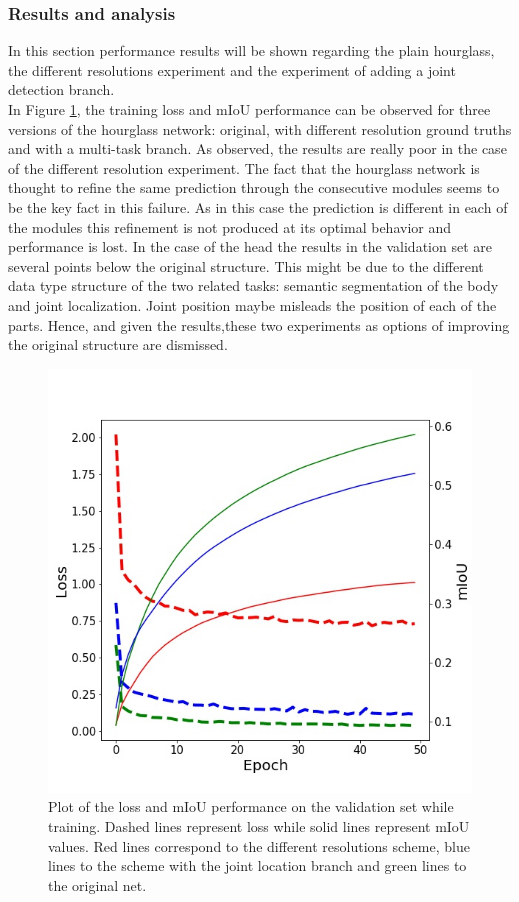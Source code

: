 \subsubsection{Results and analysis}

In this section performance results will be shown regarding the plain hourglass, the different resolutions experiment and the experiment of adding a joint detection branch.\\

In Figure \ref{hourglass:resultsplot}, the training loss and mIoU performance can be observed for three versions of the hourglass network: original, with different resolution ground truths and with a multi-task branch. As observed, the results are really poor in the case of the different resolution experiment. The fact that the hourglass network is thought to refine the same prediction through the consecutive modules seems to be the key fact in this failure. As in this case the prediction is different in each of the modules this refinement is not produced at its optimal behavior and performance is lost. In the case of the head the results in the validation set are several points below the original structure. This might be due to the different data type structure of the two related tasks: semantic segmentation of the body and joint localization. Joint position maybe misleads the position of each of the parts. Hence, and given the results,these two experiments as options of improving the original structure are dismissed.\\

\begin{figure}
\centering
\includegraphics[scale=0.4]{loss_plot_GTnormal.jpg}
\caption{Plot of the loss and mIoU performance on the validation set while training. Dashed lines represent loss while solid lines represent mIoU values. Red lines correspond to the different resolutions scheme, blue lines to the scheme with the joint location branch and green lines to the original net.}
\label{hourglass:resultsplot}
\end{figure}

